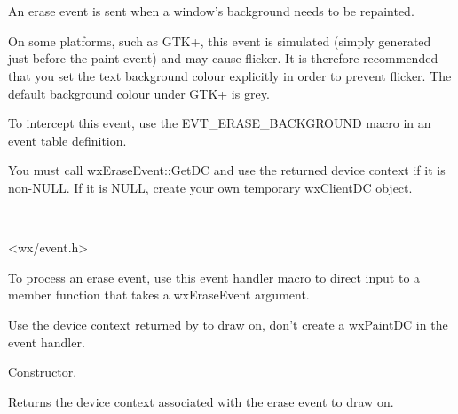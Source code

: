 \section{}\label{wxeraseevent}

An erase event is sent when a window's background needs to be repainted.

On some platforms, such as GTK+, this event is simulated (simply generated just before the
paint event) and may cause flicker. It is therefore recommended that
you set the text background colour explicitly in order to prevent flicker.
The default background colour under GTK+ is grey.

To intercept this event, use the EVT\_ERASE\_BACKGROUND macro in an event table definition.

You must call wxEraseEvent::GetDC and use the returned device context if it is non-NULL.
If it is NULL, create your own temporary wxClientDC object. 


\\


<wx/event.h>




To process an erase event, use this event handler macro to direct input to a member
function that takes a wxEraseEvent argument.

\twocolwidtha{7cm}
\begin{twocollist}\itemsep=0pt
\end{twocollist}%


Use the device context returned by  to draw on,
don't create a wxPaintDC in the event handler.




\label{wxeraseeventctor}


Constructor.

\label{wxeraseeventgetdc}


Returns the device context associated with the erase event to draw on.

